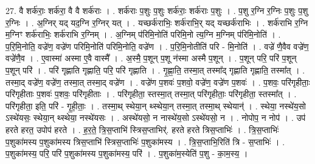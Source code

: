 \documentclass[17pt]{extarticle}
\begin{document}
27. वै शर्क॑राः॒ शर्क॑रा॒ वै वै शर्क॑राः । . शर्क॑राः प॒शुः प॒शुः शर्क॑राः॒ शर्क॑राः प॒शुः । . प॒शु र॒ग्नि र॒ग्निः प॒शुः प॒शु र॒ग्निः । . अ॒ग्निर् यद् यद॒ग्नि र॒ग्निर् यत् । . यच्छर्क॑राभिः॒ शर्क॑राभि॒र् यद् यच्छर्क॑राभिः । . शर्क॑राभि र॒ग्नि म॒ग्निꣳ शर्क॑राभिः॒ शर्क॑राभि र॒ग्निम् । . अ॒ग्निम् प॑रिमि॒नोति॑ परिमि॒नो त्य॒ग्नि म॒ग्निम् प॑रिमि॒नोति॑ । . प॒रि॒मि॒नोति॒ वज्रे॑ण॒ वज्रे॑ण परिमि॒नोति॑ परिमि॒नोति॒ वज्रे॑ण । . प॒रि॒मि॒नोतीति॑ परि - मि॒नोति॑ । . वज्रे॑ णै॒वैव वज्रे॑ण॒ वज्रे॑णै॒व । . ए॒वास्मा॑ अस्मा ए॒वै वास्मै᳚ । . अ॒स्मै॒ प॒शून् प॒शू न॑स्मा अस्मै प॒शून् । . प॒शून् परि॒ परि॑ प॒शून् प॒शून् परि॑ । . परि॑ गृह्णाति गृह्णाति॒ परि॒ परि॑ गृह्णाति । . गृ॒ह्णा॒ति॒ तस्मा॒त् तस्मा᳚द् गृह्णाति गृह्णाति॒ तस्मा᳚त् । . तस्मा॒द् वज्रे॑ण॒ वज्रे॑ण॒ तस्मा॒त् तस्मा॒द् वज्रे॑ण । . वज्रे॑ण प॒शवः॑ प॒शवो॒ वज्रे॑ण॒ वज्रे॑ण प॒शवः॑ । . प॒शवः॒ परि॑गृहीताः॒ परि॑गृहीताः प॒शवः॑ प॒शवः॒ परि॑गृहीताः । . परि॑गृहीता॒ स्तस्मा॒त् तस्मा॒त् परि॑गृहीताः॒ परि॑गृहीता॒ स्तस्मा᳚त् । . परि॑गृहीता॒ इति॒ परि॑ - गृ॒ही॒ताः॒ । . तस्मा॒थ् स्थेया॒न् थ्स्थेया॒न् तस्मा॒त् तस्मा॒थ् स्थेयान्॑ । . स्थेया॒ नस्थे॑य॒सो ऽस्थे॑यसः॒ स्थेया॒न् थ्स्थेया॒ नस्थे॑यसः । . अस्थे॑यसो॒ न नास्थे॑य॒सो ऽस्थे॑यसो॒ न । . नोपोप॒ न नोप॑ । . उप॑ हरते हरत॒ उपोप॑ हरते । . ह॒र॒ते॒ त्रि॒स॒प्ताभि॑ स्त्रिस॒प्ताभिर्॑. हरते हरते त्रिस॒प्ताभिः॑ । . त्रि॒स॒प्ताभिः॑ प॒शुका॑मस्य प॒शुका॑मस्य त्रिस॒प्ताभि॑ स्त्रिस॒प्ताभिः॑ प॒शुका॑मस्य । . त्रि॒स॒प्ताभि॒रिति॑ त्रि - स॒प्ताभिः॑ । . प॒शुका॑मस्य॒ परि॒ परि॑ प॒शुका॑मस्य प॒शुका॑मस्य॒ परि॑ । . प॒शुका॑म॒स्येति॑ प॒शु - का॒म॒स्य॒ । \newline
\end{document}
